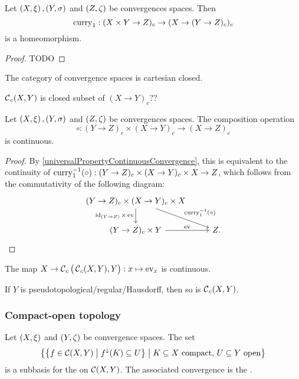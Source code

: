 \begin{proposition}
Let $\left( X, \xi \right), \left( Y,\sigma \right)$ and $\left( Z,\zeta \right)$ be convergences spaces. Then
\[ \operatorname{curry}_1: (X\times Y \to Z)_c \to (X\to (Y\to Z)_c)_c \]
is a homeomorphism.
\end{proposition}
\begin{proof}
TODO
\end{proof}
\begin{corollary}
The category of convergence spaces is cartesian closed.
\end{corollary}

\begin{proposition}
$\operatorname{\mathcal{C}}_c(X,Y)$ is closed subset of $(X\to Y)_c$??
\end{proposition}

\begin{proposition}
Let $\left( X, \xi \right), \left( Y,\sigma \right)$ and $\left( Z,\zeta \right)$ be convergences spaces. The composition operation
\[ \circ: (Y\to Z)_c \times (X\to Y)_c \to (X\to Z)_c \]
is continuous.
\end{proposition}
\begin{proof}
By \ref{universalPropertyContinuousConvergence}, this is equivalent to the continuity of $\operatorname{curry}_1^{-1}(\circ): (Y\to Z)_c \times (X\to Y)_c \times X \to Z$, which follows from the commutativity of the following diagram:
\[\begin{tikzcd}
(Y\to Z)_c \times (X\to Y)_c \times X \ar[d, swap, "\id_{(Y\to Z)}\times \evalMap"] \ar[dr, "\curry_1^{-1}(\circ)"] & \\
(Y\to Z)_c\times Y \ar[r, "\evalMap"] & Z.
\end{tikzcd} \]
\end{proof}

\begin{proposition}
The map $X\to \operatorname{\mathcal{C}}_c\big(\operatorname{\mathcal{C}}_c(X,Y),Y\big): x\mapsto \operatorname{ev}_x$ is continuous.
\end{proposition}

\begin{proposition}
If $Y$ is pseudotopological/regular/Hausdorff, then so is $\operatorname{\mathcal{C}}_c(X,Y)$.
\end{proposition}

\subsubsection{Compact-open topology}
\begin{definition}
Let $\left( X,\xi \right)$ and $\left( Y,\zeta \right)$ be convergence spaces. The set
\[ \left\{ \left\{ f\in \operatorname{\mathcal{C}}(X,Y) \;\middle|\; f^\downarrow(K)\subseteq U \right\} \;\middle|\; \text{$K\subseteq X$ compact, $U\subseteq Y$ open} \right\} \]
is a subbasis for the  on $\operatorname{\mathcal{C}}(X,Y)$. The associated convergence is the .
\end{definition}


